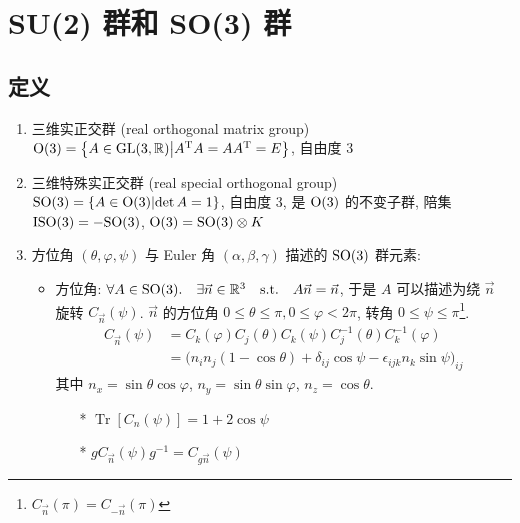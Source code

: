 \documentclass[12pt,a4paper]{article}%
\numberwithin{equation}{section}%
\DeclareMathOperator\Tr{Tr}
\begin{document}
\section{SU(2) 群和 SO(3) 群} %
\label{sec:su2_and_so3}
\subsection{定义} %
\label{sub:su_so_def}
\begin{enumerate}
	\item 三维实正交群 (real
orthogonal matrix group) $\mathrm{O}(3) = \left\{A\in\mathrm{GL}(3,\mathbb R)\middle|A^\mathrm{T} A = AA^\mathrm{T} = E\right\}$, 自由度 $3$
	\item 三维特殊实正交群 (real special orthogonal group) $\mathrm{SO}(3) = \left\{A\in\mathrm{O}(3)\middle|\det A = 1\right\}$, 自由度 $3$, 是 $\mathrm{O}(3)$ 的不变子群, 陪集 $\mathrm{ISO}(3) = -\mathrm{SO}(3)$, $\mathrm{O}(3) = \mathrm{SO}(3)\otimes K$
	\item 方位角 $(\theta, \varphi, \psi)$ 与 Euler 角 $(\alpha, \beta, \gamma)$ 描述的 $\mathrm{SO}(3)$ 群元素:
	\begin{itemize}
		\item 方位角: $\forall A\in\mathrm{SO}(3).\quad \exists \vec n\in\mathbb R^3 \quad\mathrm{s.t.}\quad A\vec n = \vec n$, 于是 $A$ 可以描述为绕 $\vec n$ 旋转 $C_{\vec n}(\psi)$. $\vec n$ 的方位角 $0\le\theta\le\pi, 0\le\varphi < 2\pi$, 转角 $0\le\psi\le\pi$\footnote{$C_{\vec n}(\pi) = C_{-\vec n}(\pi)$}. 
		\begin{align}
			C_{\vec n}(\psi) &= C_k(\varphi)C_j(\theta) C_k(\psi) C_j^{-1}(\theta)C_k^{-1}(\varphi) \\
			&= \Big (n_i n_j(1-\cos\theta) + \delta_{ij}\cos\psi - \epsilon_{ijk}n_k\sin\psi\Big)_{ij}\label{equ:so3_n_psi}
		\end{align}
			其中 $n_x = \sin\theta\cos\varphi$, $n_y = \sin\theta\sin\varphi$, $n_z = \cos\theta$.
			\begin{itemize}
				\item[*] $\Tr[C_n(\psi)] = 1+2\cos\psi$
				\item[*] $gC_{\vec n}(\psi)g^{-1} = C_{g\vec n}(\psi)$

\end{itemize}
\end{itemize}
\end{enumerate}
\end{document}

